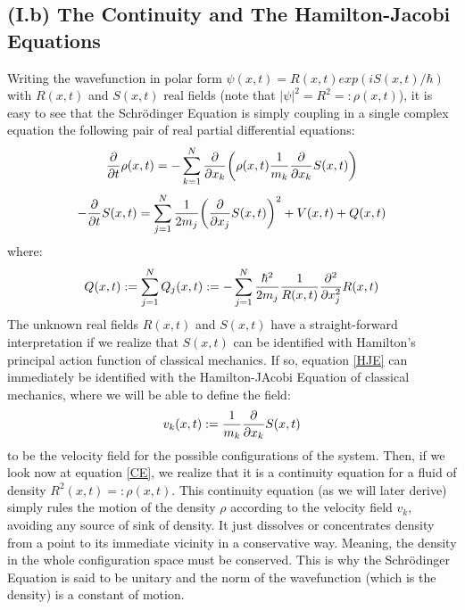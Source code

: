 \documentclass[11pt, a4paper]{article} %
\begin{document}
\subsection*{(I.b) The Continuity and The Hamilton-Jacobi Equations}
Writing the wavefunction in polar form $\psi(x,t)=R(x,t)exp(iS(x,t)/\hbar)$ with $R(x,t)$ and $S(x,t)$ real fields (note that $|\psi|^2=R^2=:\rho(x,t)$), it is easy to see that the Schrödinger Equation is simply coupling in a single complex equation the following pair of real partial differential equations:
\begin{equation}\label{CE}
\pdv{}{t} \rho(x,t)=-\sum_{k=1}^N \pdv{}{x_k}\qty( \rho(x,t)\frac{1}{m_k}\pdv{}{x_k} S(x,t) )
\end{equation}
\begin{equation}\label{HJE}
-\pdv{}{t}S(x,t) = \sum_{j=1}^N \frac{1}{2m_j} \qty(\pdv{}{x_j} S(x,t) )^2+ V(x,t)+Q(x,t)
\end{equation}
where:
\begin{equation}\label{QP}
Q(x,t):=\sum_{j=1}^N Q_j(x,t):=-\sum_{j=1}^N \frac{\hbar^2}{2m_j}\frac{1}{R(x,t)}\pdv[2]{}{x_j} R(x,t)
\end{equation}
The unknown real fields $R(x,t)$ and $S(x,t)$ have a straight-forward interpretation if we realize that $S(x,t)$ can be identified with Hamilton's principal action function of classical mechanics. If so, equation \eqref{HJE} can immediately be identified with the Hamilton-JAcobi Equation of classical mechanics, where we will be able to define the field:%
\begin{equation}
v_k(x,t):=\frac{1}{m_k}\pdv{}{x_k}S(x,t)
\end{equation}
to be the velocity field for the possible configurations of the system. Then, if we look now at equation \eqref{CE}, we realize that it is a continuity equation for a fluid of density $R^2(x,t)=:\rho(x,t)$. This continuity equation (as we will later derive) simply rules the motion of the density $\rho$ according to the velocity field $v_k$, avoiding any source of sink of density. It just dissolves or concentrates density from a point to its immediate vicinity in a conservative way. Meaning, the density in the whole configuration space must be conserved. This is why the Schrödinger Equation is said to be unitary and the norm of the wavefunction (which is the density) is a constant of motion.
\end{document}

